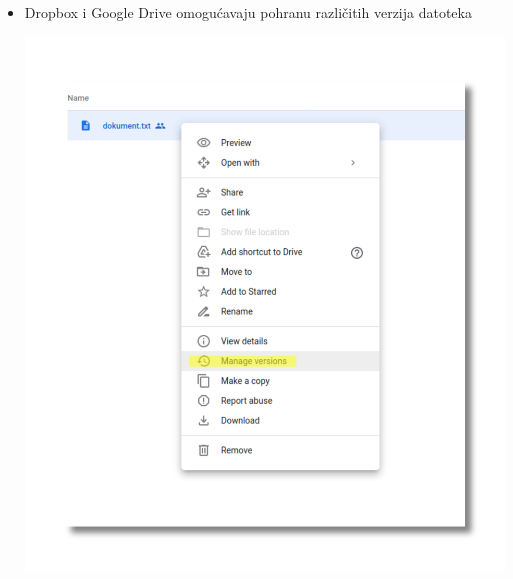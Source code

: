 \documentclass[aspectratio=169]{beamer}
\begin{document}
\begin{frame}
    \begin{itemize}
        \item Dropbox i Google Drive omogućavaju pohranu različitih verzija
            datoteka
            
        \vspace{1em}
            
        \begin{center}
            \includegraphics[scale=.28]{images/drive-vcs.png}
        \end{center}
    \end{itemize}
\end{frame}
\end{document}

